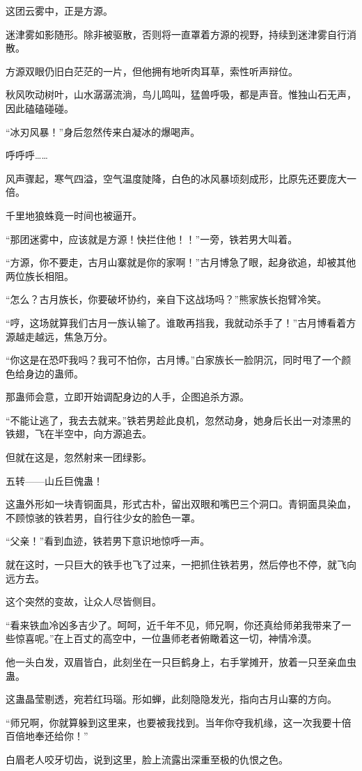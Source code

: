\begin{this_body}
这团云雾中，正是方源。

迷津雾如影随形。除非被驱散，否则将一直罩着方源的视野，持续到迷津雾自行消散。

方源双眼仍旧白茫茫的一片，但他拥有地听肉耳草，索性听声辩位。

秋风吹动树叶，山水潺潺流淌，鸟儿鸣叫，猛兽呼吸，都是声音。惟独山石无声，因此磕磕碰碰。

“冰刃风暴！”身后忽然传来白凝冰的爆喝声。

呼呼呼……

风声骤起，寒气四溢，空气温度陡降，白色的冰风暴顷刻成形，比原先还要庞大一倍。

千里地狼蛛竟一时间也被逼开。

“那团迷雾中，应该就是方源！快拦住他！！”一旁，铁若男大叫着。

“方源，你不要走，古月山寨就是你的家啊！”古月博急了眼，起身欲追，却被其他两位族长相阻。

“怎么？古月族长，你要破坏协约，亲自下这战场吗？”熊家族长抱臂冷笑。

“哼，这场就算我们古月一族认输了。谁敢再挡我，我就动杀手了！”古月博看着方源越走越远，焦急万分。

“你这是在恐吓我吗？我可不怕你，古月博。”白家族长一脸阴沉，同时甩了一个颜色给身边的蛊师。

那蛊师会意，立即开始调配身边的人手，企图追杀方源。

“不能让逃了，我去去就来。”铁若男趁此良机，忽然动身，她身后长出一对漆黑的铁翅，飞在半空中，向方源追去。

但就在这是，忽然射来一团绿影。

五转——山丘巨傀蛊！

这蛊外形如一块青铜面具，形式古朴，留出双眼和嘴巴三个洞口。青铜面具染血，不顾惊骇的铁若男，自行往少女的脸色一罩。

“父亲！”看到血迹，铁若男下意识地惊呼一声。

就在这时，一只巨大的铁手也飞了过来，一把抓住铁若男，然后停也不停，就飞向远方去。

这个突然的变故，让众人尽皆侧目。

“看来铁血冷凶多吉少了。呵呵，近千年不见，师兄啊，你还真给师弟我带来了一些惊喜呢。”在上百丈的高空中，一位蛊师老者俯瞰着这一切，神情冷漠。

他一头白发，双眉皆白，此刻坐在一只巨鹤身上，右手掌摊开，放着一只至亲血虫蛊。

这蛊晶莹剔透，宛若红玛瑙。形如蝉，此刻隐隐发光，指向古月山寨的方向。

“师兄啊，你就算躲到这里来，也要被我找到。当年你夺我机缘，这一次我要十倍百倍地奉还给你！”

白眉老人咬牙切齿，说到这里，脸上流露出深重至极的仇恨之色。

\end{this_body}

